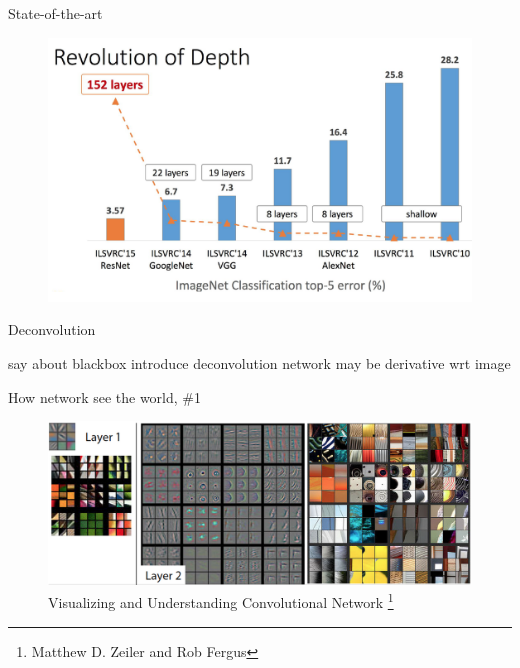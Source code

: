 \documentclass{beamer}
\begin{document}
\begin{frame}{State-of-the-art}

\begin{figure}[h!]
  \centering
  \includegraphics[width=1\textwidth]{images/rev_depth.png}
\end{figure}

\end{frame}


\begin{frame}{Deconvolution}

say about blackbox
introduce deconvolution network
may be derivative wrt image

\end{frame}


\begin{frame}{How network see the world, \#1}

\begin{figure}[h!]
  \centering
  \includegraphics[width=1\textwidth]{images/features1.png}
  \caption{Visualizing and Understanding Convolutional Network \footnote{Matthew D. Zeiler and Rob Fergus}}
\end{figure}

\end{frame}
\end{document}

